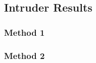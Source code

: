 \subsection{Intruder Results \label{sec:basic_results}}
\subsubsection{Method 1}
\subsubsection{Method 2}